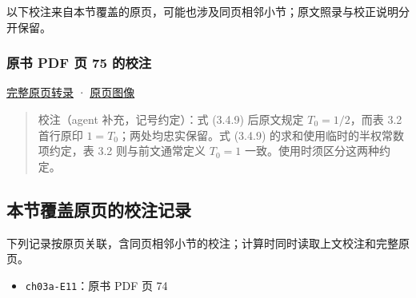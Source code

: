 \documentclass[
  10pt,
  fontset=fandol]{ctexart}
\providecommand{\tightlist}{%
  \setlength{\itemsep}{0pt}\setlength{\parskip}{0pt}}
\begin{document}
以下校注来自本节覆盖的原页，可能也涉及同页相邻小节；原文照录与校正说明分开保留。

\subsubsection{原书 PDF 页 75 的校注}\label{ux539fux4e66-pdf-ux9875-75-ux7684ux6821ux6ce8}

\href{../pages/pdf-075.md}{完整原页转录} · \href{../../source-images/pdf-075.jpeg}{原页图像}

\begin{quote}
校注（agent 补充，记号约定）：式 (3.4.9) 后原文规定 \(T_0=1/2\)，而表 3.2 首行原印 \(1=T_0\)；两处均忠实保留。式 (3.4.9) 的求和使用临时的半权常数项约定，表 3.2 则与前文通常定义 \(T_0=1\) 一致。使用时须区分这两种约定。
\end{quote}

\subsection{本节覆盖原页的校注记录}\label{ux672cux8282ux8986ux76d6ux539fux9875ux7684ux6821ux6ce8ux8bb0ux5f55}

下列记录按原页关联，含同页相邻小节的校注；计算时同时读取上文校注和完整原页。

\begin{itemize}
\tightlist
\item
  \texttt{ch03a-E11}：原书 PDF 页 74
\end{itemize}
\end{document}
